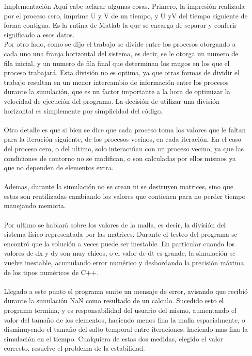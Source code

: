 \begin{section}{Implementación}
Aquí cabe aclarar algunas cosas. Primero, la impresión realizada por el proceso cero, imprime U y V de un tiempo, y U yV del tiempo siguiente de forma contigua. Es la rutina de Matlab la que se encarga de separar y conferir significado a esos datos. 
~\\
Por otro lado, como se dijo el trabajo se divide entre los procesos otorgando a cada uno una franja horizontal del sistema, es decir, se le otorga un numero de fila inicial, y un numero de fila final que determinan los rangos en los que el proceso trabajará. Esta división no es optima, ya que otras formas de dividir el trabajo resultan en un menor intercambio de información entre los procesos durante la simulación, que es un factor importante a la hora de optimizar la velocidad de ejecución del programa. La decisión de utilizar una división horizontal es simplemente por simplicidad del código.
~\\
~\\
Otro detalle es que si bien se dice que cada proceso toma los valores que le faltan para la iteración siguiente, de los procesos vecinos, en cada iteración. En el caso del proceso cero, o del ultimo, solo interactúan con un proceso vecino, ya que las condiciones de contorno no se modifican, o son calculadas por ellos mismos ya que no dependen de elementos extra.
~\\
~\\ Ademas, durante la simulación no se crean ni se destruyen matrices, sino que estas son reutilizadas cambiando los valores que contienen para no perder tiempo manejando memoria.
~\\
~\\
Por ultimo se hablará sobre los valores de la malla, es decir, la división del sistema físico representada por las matrices. Durante el testeo del programa se encontró que la solución a veces puede ser inestable. En particular cuando los valores de dx y dy son muy chicos, o el valor de dt es grande, la simulación se vuelve inestable, acumulando error numérico y desbordando la precisión máxima de los tipos numéricos de C++. 
~\\
~\\
Llegado a este punto el programa emite un mensaje de error, avisando que recibió durante la simulación NaN como resultado de un calculo. Sucedido esto el programa termina, y es responsabilidad del usuario del mismo, aumentando el valor del tamaño de los elementos, haciendo menos fina la malla espacialmente, o disminuyendo el tamaño del salto temporal entre iteraciones, haciendo mas fina la simulación en el tiempo. Cualquiera de estas dos medidas, elegido el valor correcto, resuelve el problema de la estabilidad. 

\end{section}

